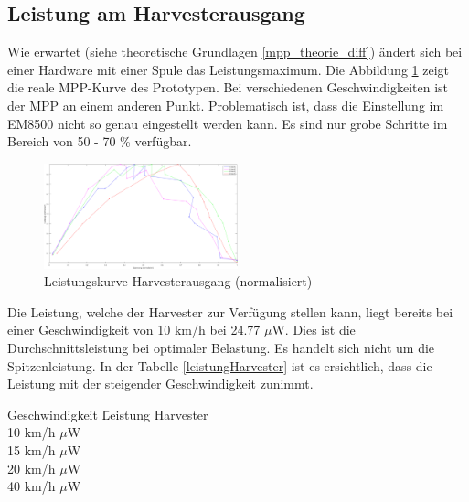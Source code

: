 \subsection{Leistung am Harvesterausgang}

Wie erwartet (siehe theoretische Grundlagen \ref{mpp_theorie_diff}) ändert sich bei einer Hardware mit einer Spule das Leistungsmaximum. Die Abbildung \ref{mpp_resultat_harvester} zeigt die reale MPP-Kurve des Prototypen. Bei verschiedenen Geschwindigkeiten ist der MPP an einem anderen Punkt. Problematisch ist, dass die Einstellung im EM8500 nicht so genau eingestellt werden kann. Es sind nur grobe Schritte im Bereich von 50 - 70 \% verfügbar. 

\begin{figure}[ht]
    \includegraphics[width=0.5\textwidth]{4Resultate/imag/MPPHarvester.png} 
    \caption{Leistungskurve Harvesterausgang (normalisiert)}
    \label{mpp_resultat_harvester}
\end{figure}

Die Leistung, welche der Harvester zur Verfügung stellen kann, liegt bereits bei einer Geschwindigkeit von 10 km/h bei 24.77 $\mu$W. Dies ist die Durchschnittsleistung bei optimaler Belastung. Es handelt sich nicht um die Spitzenleistung. In der Tabelle \ref{leistungHarvester} ist es ersichtlich, dass die Leistung mit der steigender Geschwindigkeit zunimmt.

\begin{minipage}{\textwidth}
    \label{leistungHarvester}
    \begin{tabbing}
        Geschwindigkeit \quad\= Leistung Harvester \\[0.8ex]
        10 km/h    $\mu$W \\
        15 km/h    $\mu$W \\
        20 km/h  $\mu$W \\
        40 km/h  $\mu$W \\
    \end{tabbing}
\end{minipage}


